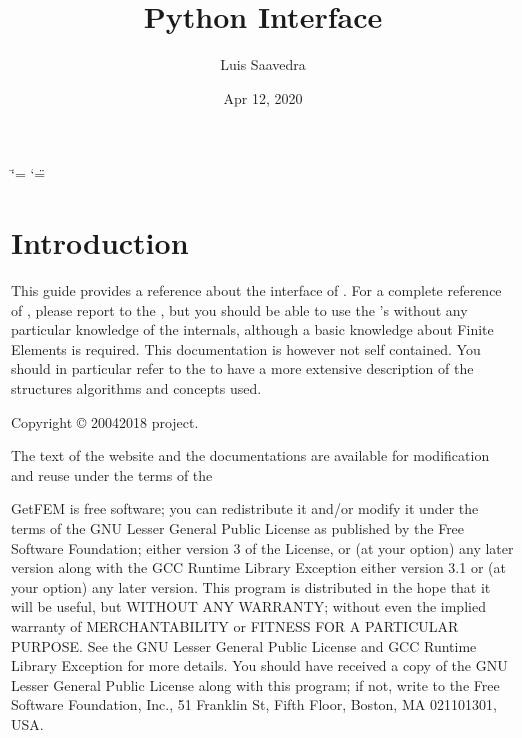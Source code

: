 \documentclass[a4paper,11pt,english]{sphinxmanual}
\title{Python Interface}
\date{Apr 12, 2020}
\author{Luis Saavedra}
\begin{document}
\ifdefined\shorthandoff
  \ifnum\catcode`\=\string=\active\shorthandoff{=}\fi
  \ifnum\catcode`\"=\active{}\fi
\fi

\pagestyle{empty}
\sphinxmaketitle
\pagestyle{plain}
\sphinxtableofcontents
\pagestyle{normal}
\label{\detokenize{python/index::doc}}



\chapter{Introduction}
\label{\detokenize{python/intro:introduction}}\label{\detokenize{python/intro:py-intro}}\label{\detokenize{python/intro::doc}}
This guide provides a reference about the  interface of . For a complete
reference of , please report to the , but you should be able
to use the ’s without any particular knowledge of the  internals,
although a basic knowledge about Finite Elements is required. This documentation
is however not self contained. You should in
particular refer to the  to have a more extensive
description of the structures algorithms and concepts used.

Copyright © 2004\sphinxhyphen{}2018  project.

The text of the  website and the documentations are available for modification and reuse under the terms of the 

GetFEM  is  free software;  you  can  redistribute  it  and/or modify it
under  the  terms  of the  GNU  Lesser General Public License as published
by  the  Free Software Foundation;  either version 3 of the License,  or
(at your option) any later version along with the GCC Runtime Library
Exception either version 3.1 or (at your option) any later version.
This program  is  distributed  in  the  hope  that it will be useful,  but
WITHOUT ANY WARRANTY; without even the implied warranty of MERCHANTABILITY
or  FITNESS  FOR  A PARTICULAR PURPOSE.  See the GNU Lesser General Public
License and GCC Runtime Library Exception for more details.
You  should  have received a copy of the GNU Lesser General Public License
along  with  this program;  if not, write to the Free Software Foundation,
Inc., 51 Franklin St, Fifth Floor, Boston, MA  02110\sphinxhyphen{}1301, USA.
\end{document}
